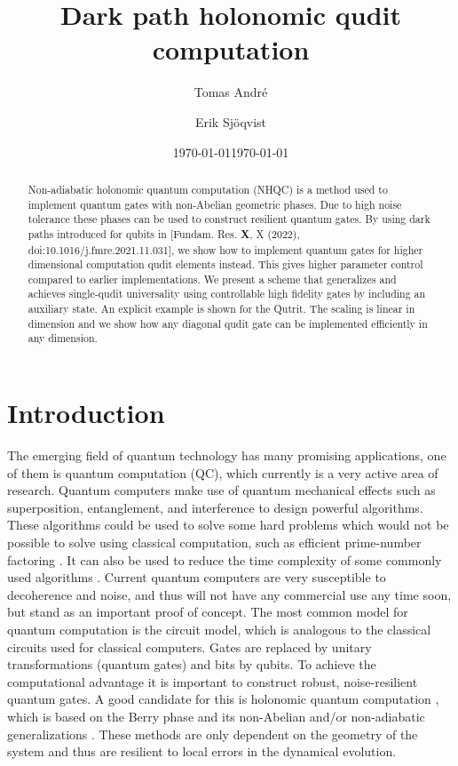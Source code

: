 \documentclass[pra,showpacs,priprent,twocolumn,superscriptaddress]{revtex4-1}
\begin{document}
\title{Dark path holonomic qudit computation}
\author{Tomas Andr\'e}
\author{Erik Sj\"oqvist}
\date{\today}
\begin{abstract}
Non-adiabatic holonomic quantum computation (NHQC) is a method used to implement 
quantum gates with non-Abelian geometric phases. Due to high noise tolerance these phases 
can be used to construct resilient quantum gates. By using dark paths introduced for qubits 
in [Fundam. Res. {\bf X}, X (2022), doi:10.1016/j.fmre.2021.11.031], we show how to 
implement quantum gates for 
higher dimensional computation qudit elements instead. This gives higher parameter control 
compared to earlier implementations. We present a scheme that generalizes and achieves 
single-qudit universality using controllable high fidelity gates by including an auxiliary state. 
An explicit example is shown for the Qutrit. The scaling is linear in dimension and we show 
how any diagonal qudit gate can be implemented efficiently in any dimension.
\end{abstract}
\maketitle
\date{\today}

\section{Introduction}
The emerging field of quantum technology has many promising applications, one of them is quantum computation (QC), which currently is a very active area of research. Quantum computers make use of quantum mechanical effects such as superposition, entanglement, and interference to design powerful algorithms. These algorithms could be used to solve some hard problems which would not be  possible to solve using classical computation, such as efficient prime-number factoring \cite{shor94}. It can also be used to reduce the time complexity of some commonly used algorithms \cite{grover97}. Current quantum computers are very susceptible to decoherence and noise, and thus will not have any commercial use any time soon, but stand as an important proof of concept. 
The most common model for quantum computation is the circuit model, which is analogous to the classical circuits used for classical computers. Gates are replaced by unitary transformations (quantum gates) and bits by qubits. To achieve the computational advantage it is important to construct robust, noise-resilient quantum gates. A good candidate for this is holonomic quantum computation \cite{zanardi99,sjoqvist12}, which is based on the Berry phase \cite{berry84} and its non-Abelian and/or non-adiabatic generalizations \cite{aharonov87,anandan88,wilczek84}. These methods are only dependent on the geometry of the system and thus are resilient to local errors in the dynamical evolution.
\end{document}
